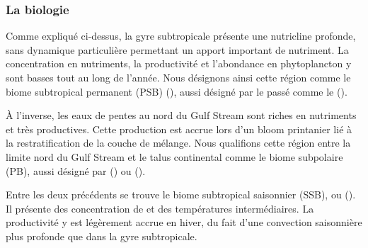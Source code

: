 \subsubsection{La biologie}
\label{sec:gs-biologie}

Comme expliqué ci-dessus, la gyre subtropicale présente une nutricline profonde, sans dynamique particulière permettant un apport important de nutriment.
La concentration en nutriments, la productivité et l'abondance en phytoplancton y sont basses tout au long de l'année.
Nous désignons ainsi cette région comme le biome subtropical permanent (PSB) (), aussi désigné par le passé comme le  (\cite{sarmiento_2004}).

À l'inverse, les eaux de pentes au nord du Gulf Stream sont riches en nutriments et très productives.
Cette production est accrue lors d'un bloom printanier lié à la restratification de la couche de mélange.
Nous qualifions cette région entre la limite nord du Gulf Stream et le talus continental comme le biome subpolaire (PB), aussi désigné par  (\cite{sarmiento_2004}) ou  (\cite{bock_2022}).

Entre les deux précédents se trouve le biome subtropical saisonnier (SSB), ou  (\cite{sarmiento_2004}).
Il présente des concentration de  et des températures intermédiaires.
La productivité y est légèrement accrue en hiver, du fait d'une convection saisonnière plus profonde que dans la gyre subtropicale.

